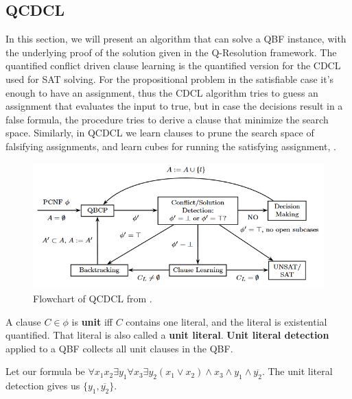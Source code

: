 \subsection{QCDCL}

In this section, we will present an algorithm that can solve a QBF instance, with the underlying proof of the solution given in the Q-Resolution framework. The quantified conflict driven clause learning is the quantified version for the CDCL used for SAT solving. For the propositional problem in the satisfiable case it's enough to have an assignment, thus the CDCL algorithm tries to guess an assignment that evaluates the input to true, but in case the decisions result in a false formula, the procedure tries to derive a clause that minimize the search space. Similarly, in QCDCL we learn clauses to prune the search space of falsifying assignments, and learn cubes for running the satisfying assignment, \cite{handbook}.


\begin{figure}[H]
\centering
\includegraphics[width=1\textwidth]{../graphics/qcdcl-flowchart.png}
\caption{Flowchart of QCDCL from \cite{handbook}.}
\end{figure}


\begin{definition}
    A clause $C \in \phi$ is \textbf{unit} iff $C$ contains one literal, and the literal is existential quantified. That literal is also called a \textbf{unit literal}. \textbf{Unit literal detection} applied to a QBF collects all unit clauses in the QBF.
\end{definition}

\begin{example}
    Let our formula be $\forall x_1x_2 \exists y_1 \forall x_3 \exists y_2 (x_1 \lor x_2) \land x_3 \land y_1 \land \overline{y_2}$. The unit literal detection gives us $\{y_1, \overline{y_2}\}$.
\end{example}

